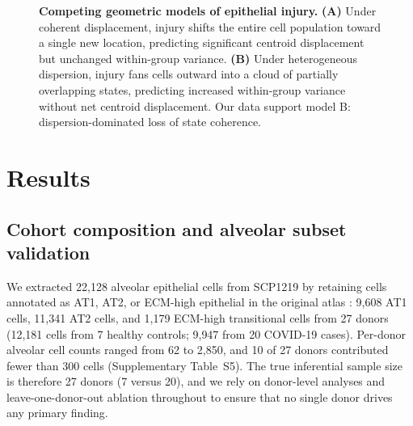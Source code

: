\documentclass[11pt]{article}
\begin{document}
\begin{figure}[htbp]
\caption{\textbf{Competing geometric models of epithelial injury.} \textbf{(A)} Under coherent displacement, injury shifts the entire cell population toward a single new location, predicting significant centroid displacement but unchanged within-group variance. \textbf{(B)} Under heterogeneous dispersion, injury fans cells outward into a cloud of partially overlapping states, predicting increased within-group variance without net centroid displacement. Our data support model B: dispersion-dominated loss of state coherence.}
\label{fig:fig1}
\end{figure}

\section{Results}

\subsection{Cohort composition and alveolar subset validation}

We extracted 22{,}128 alveolar epithelial cells from SCP1219 by retaining cells annotated as AT1, AT2, or ECM-high epithelial in the original atlas \citep{Melms2021}: 9{,}608 AT1 cells, 11{,}341 AT2 cells, and 1{,}179 ECM-high transitional cells from 27 donors (12{,}181 cells from 7 healthy controls; 9{,}947 from 20 COVID-19 cases). Per-donor alveolar cell counts ranged from 62 to 2{,}850, and 10 of 27 donors contributed fewer than 300 cells (Supplementary Table~S5). The true inferential sample size is therefore 27 donors (7 versus 20), and we rely on donor-level analyses and leave-one-donor-out ablation throughout to ensure that no single donor drives any primary finding.
\end{document}
